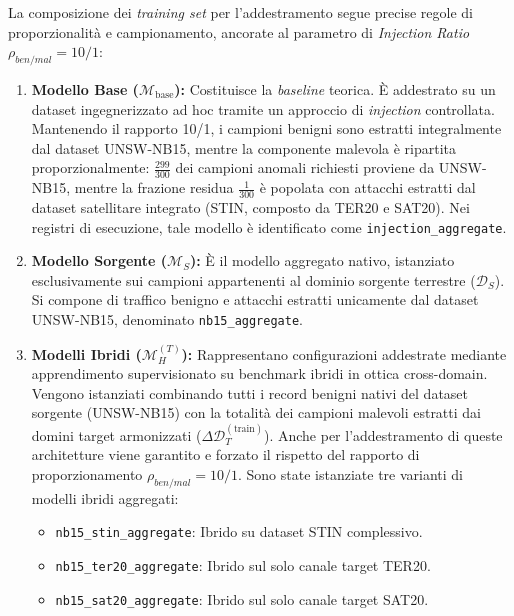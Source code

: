 La composizione dei \textit{training set} per l'addestramento segue precise regole di proporzionalità e campionamento, ancorate al parametro di \textit{Injection Ratio} $\rho_{ben/mal} = 10/1$:
\begin{enumerate}
    \item \textbf{Modello Base ($\mathcal{M}_{\text{base}}$):} Costituisce la \textit{baseline} teorica. 
    È addestrato su un dataset ingegnerizzato ad hoc tramite un approccio di \textit{injection} controllata. 
    Mantenendo il rapporto 10/1, i campioni benigni sono estratti integralmente dal dataset UNSW-NB15, mentre la componente malevola è ripartita proporzionalmente: $\frac{299}{300}$ dei campioni anomali richiesti proviene da UNSW-NB15, mentre la frazione residua $\frac{1}{300}$ è popolata con attacchi estratti dal dataset satellitare integrato (STIN, composto da TER20 e SAT20). 
    Nei registri di esecuzione, tale modello è identificato come \texttt{injection\_aggregate}.
    
    \item \textbf{Modello Sorgente ($\mathcal{M}_S$):} È il modello aggregato nativo, istanziato esclusivamente sui campioni appartenenti al dominio sorgente terrestre ($\mathcal{D}_S$). 
    Si compone di traffico benigno e attacchi estratti unicamente dal dataset UNSW-NB15, denominato \texttt{nb15\_aggregate}.
    
    \item \textbf{Modelli Ibridi ($\mathcal{M}_H^{(T)}$):} Rappresentano configurazioni addestrate mediante apprendimento supervisionato su benchmark ibridi in ottica cross-domain. 
    Vengono istanziati combinando tutti i record benigni nativi del dataset sorgente (UNSW-NB15) con la totalità dei campioni malevoli estratti dai domini target armonizzati ($\Delta\mathcal{D}_T^{(\text{train})}$). 
    Anche per l'addestramento di queste architetture viene garantito e forzato il rispetto del rapporto di proporzionamento $\rho_{ben/mal} = 10/1$. 
    Sono state istanziate tre varianti di modelli ibridi aggregati:
    \begin{itemize}
        \item \texttt{nb15\_stin\_aggregate}: Ibrido su dataset STIN complessivo.
        \item \texttt{nb15\_ter20\_aggregate}: Ibrido sul solo canale target TER20.
        \item \texttt{nb15\_sat20\_aggregate}: Ibrido sul solo canale target SAT20.
    \end{itemize}
\end{enumerate}

